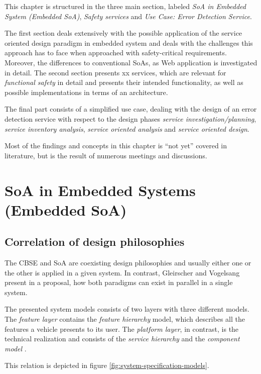 This chapter is structured in the three main section, labeled \emph{SoA in Embedded System (Embedded SoA)}, \emph{Safety services} and \emph{Use Case: Error Detection Service}. 

The first section deals extensively with the possible application of the service oriented design paradigm in embedded system and deals with the challenges this approach has to face when approached with safety-critical requirements. Moreover, the differences to conventional SoAs, as Web application is investigated in detail. 
The second section presents xx services, which are relevant for \emph{functional safety} in detail and presents their intended functionality, as well as possible implementations in terms of an architecture.

The final part consists of a simplified use case, dealing with the design of an error detection service with respect to the design phases \emph{service investigation/planning}, \emph{service inventory analysis}, \emph{service oriented analysis} and \emph{service oriented design}.

Most of the findings and concepts in this chapter is ``not yet'' covered in literature, but is the result of numerous meetings and discussions.

\section{SoA in Embedded Systems (Embedded SoA)}
\subsection{Correlation of design philosophies}
\label{ch:correlation-of-design-philosophies}
The CBSE and SoA are coexisting design philosophies and usually either one or the other is applied in a given system. In contrast, Gleirscher and Vogelsang present in \cite{gleirscher2014} a proposal, how both paradigms can exist in parallel in a single system.

The presented system models consists of two layers with three different models. The \emph{feature layer} contains the \emph{feature hierarchy} model, which describes all the features a vehicle presents to its user. The \emph{platform layer}, in contrast, is the technical realization and consists of the \emph{service hierarchy} and the \emph{component model} \cite{gleirscher2014}.

This relation is depicted in figure \ref{fig:system-specification-models}.

